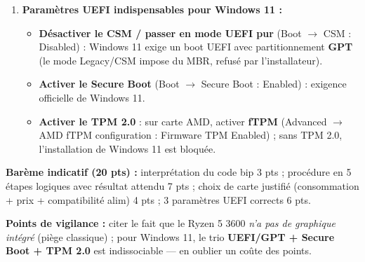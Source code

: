 \documentclass[11pt]{article}
\begin{document}
\begin{corrige}
\begin{enumerate}
    \item \textbf{Paramètres UEFI indispensables pour Windows 11 :}
    \begin{itemize}
        \item \textbf{Désactiver le CSM / passer en mode UEFI pur} (Boot $\rightarrow$ CSM : Disabled) : Windows 11 exige un boot UEFI avec partitionnement \textbf{GPT} (le mode Legacy/CSM impose du MBR, refusé par l'installateur).
        \item \textbf{Activer le Secure Boot} (Boot $\rightarrow$ Secure Boot : Enabled) : exigence officielle de Windows 11.
        \item \textbf{Activer le TPM 2.0} : sur carte AMD, activer \textbf{fTPM} (Advanced $\rightarrow$ AMD fTPM configuration : Firmware TPM Enabled) ; sans TPM 2.0, l'installation de Windows 11 est bloquée.
    \end{itemize}
\end{enumerate}

\textbf{Barème indicatif (20 pts) :} interprétation du code bip 3 pts ; procédure en 5 étapes logiques avec résultat attendu 7 pts ; choix de carte justifié (consommation + prix + compatibilité alim) 4 pts ; 3 paramètres UEFI corrects 6 pts.

\textbf{Points de vigilance :} citer le fait que le Ryzen 5 3600 \emph{n'a pas de graphique intégré} (piège classique) ; pour Windows 11, le trio \textbf{UEFI/GPT + Secure Boot + TPM 2.0} est indissociable — en oublier un coûte des points.
\end{corrige}
\end{document}
